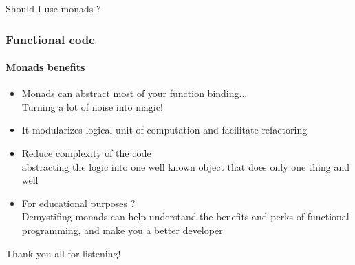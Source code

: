 \begin{frame}
  \centering
  \Huge Should I use monads ?
\end{frame}

\begin{frame}
  \frametitle{Functional code}
  \framesubtitle{Monads benefits}

  \begin{itemize}[<+->]
    \item Monads can abstract most of your function binding...
          \\\textcolor{ecgrey!50}{Turning a lot of noise into magic!}
    \item It modularizes logical unit of computation and facilitate refactoring
    \item Reduce complexity of the code
          \\\textcolor{ecgrey!50}{abstracting the logic into one well known object
            that does only one thing and well}
    \item For educational purposes ?
          \\\textcolor{ecgrey!50}{Demystifing monads can help understand
            the benefits and perks of functional programming, and make you a better
            developer}
  \end{itemize}
\end{frame}

\begin{frame}
  \centering
  \Huge Thank you all for listening!
\end{frame}
